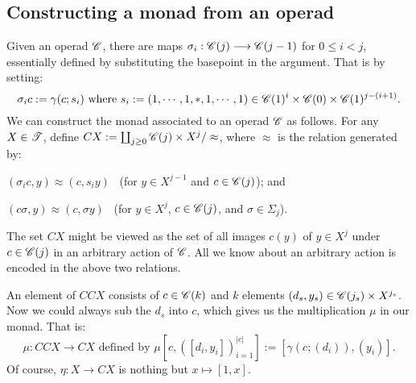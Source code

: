 \documentclass[11pt]{article}
\begin{document}
\begin{chapter1-3}
\subsection*{Constructing a monad from an operad}
Given an operad $\mathscr{C}$, there are maps $\sigma_i:\mathscr{C}(j)\longrightarrow\mathscr{C}(j-1)$ for
$0\leq i<j$, essentially defined by substituting the basepoint in the \iTH
argument. That is by setting:
\[\sigma_ic:=\gamma(c;s_i)\text{ where }s_i:=(1,\cdots,1,*,1,\cdots,1)\in \mathscr{C}(1)^i\times \mathscr{C}(0)\times\mathscr{C}(1)^{j-(i+1)}.\]
We can construct the monad associated to an operad $\mathscr{C}$ as follows. For any
$X\in\mathscr{T}$, define $CX:=\coprod_{j\geq0}\mathscr{C}(j)\times X^j/\approx$, where
$\approx$ is the relation generated by:
\begin{itemise}
\item $(\sigma_ic,y)\approx (c,s_iy)$ \ (for $y\in X^{j-1}$ and $c\in \mathscr{C}(j)$); and
\item $(c\sigma,y)\approx (c,\sigma y)$ \ (for $y\in X^{j}$, $c\in \mathscr{C}(j)$, and $\sigma\in\Sigma_j$).
\end{itemise}
The set $CX$ might be viewed as the set of all images $c(y)$ of $y\in X^j$ under $c\in\mathscr{C}(j)$ in an arbitrary action of $\mathscr{C}$. All we know about an arbitrary action is encoded in the above two relations.


An element of $CCX$ consists of $c\in \mathscr{C}(k)$ and $k$ elements 
$(d_s,y_s)\in \mathscr{C}(j_s)\times X^{j_s}$. Now we could always sub the $d_s$
into $c$, which gives us the multiplication $\mu$ in our monad. That is:
\[\mu:CCX\to CX\text{ defined by }
\mu[c,([d_i,y_i])_{i=1}^{|c|}]:=[\gamma(c;(d_i)),(y_i)].\]
Of course, $\eta:X\to CX$ is nothing but $x\mapsto [1,x]$.


\end{chapter1-3}
\end{document}
